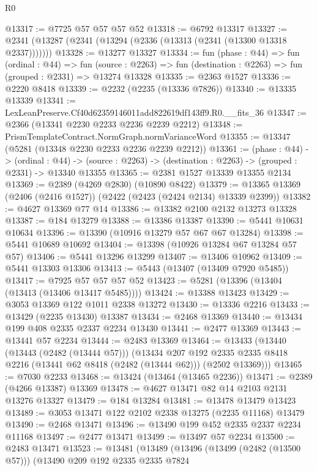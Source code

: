 \begin{lexlean}{R0}
\begin{coremodule}
@13317 := @7725 @57 @57 @57 @52
@13318 := @6792 @13317
@13327 := @2341 (@13287 (@2341 (@13294 (@2336 (@13313 (@2341 (@13300 @13318 @2337)))))))
@13328 := @13277 @13327
@13334 := fun (phase : @44) =>
  fun (ordinal : @44) =>
  fun (source : @2263) => fun (destination : @2263) => fun (grouped : @2331) => @13274 @13328
@13335 := @2363 @1527
@13336 := @2220 @8418
@13339 := @2232 (@2235 (@13336 @7826))
@13340 := @13335 @13339
@13341 := LexLeanPreserve.Cf40d62359146011add822619df143ff9.R0.__fits_36
@13347 := @2366 (@13341 @2230 @2233 @2236 @2239 @2212)
@13348 := PrismTemplateContract.NormGraph.normVarianceWord
@13355 := @13347 (@5281 (@13348 @2230 @2233 @2236 @2239 @2212))
@13361 := (phase : @44) ->
  (ordinal : @44) -> (source : @2263) -> (destination : @2263) -> (grouped : @2331) -> @13340 @13355
@13365 := @2381 @1527 @13339 @13355 @2134
@13369 := @2389 (@4269 @2830) (@10890 @8422)
@13379 := @13365 @13369 (@2406 (@2416 @1527)) (@2422 (@2423 (@2424 @2134) @13339 @2399))
@13382 := @4627 @13369 @77 @14
@13386 := @13382 @2100 @2132 @13273 @13328
@13387 := @184 @13279
@13388 := @13386 @13387
@13390 := @5441 @10631 @10634
@13396 := @13390 (@10916 @13279 @57 @67 @67 @13284)
@13398 := @5441 @10689 @10692
@13404 := @13398 (@10926 @13284 @67 @13284 @57 @57)
@13406 := @5441 @13296 @13299
@13407 := @13406 @10962
@13409 := @5441 @13303 @13306
@13413 := @5443 (@13407 (@13409 @7920 @5485))
@13417 := @7925 @57 @57 @57 @52
@13423 := @5281 (@13396 (@13404 (@13413 (@13406 @13417 @5485))))
@13424 := @13388 @13423
@13429 := @3053 @13369 @122 @1011 @2338 @13272
@13430 := @13336 @2216
@13433 := @13429 (@2235 @13430) @13387
@13434 := @2468 @13369
@13440 := @13434 @199 @408 @2335 @2337 @2234 @13430
@13441 := @2477 @13369
@13443 := @13441 @57 @2234
@13444 := @2483 @13369
@13464 := @13433
    (@13440
      (@13443 (@2482 (@13444 @57)))
      (@13434
        @207
        @192
        @2335
        @2335
        @8418
        @2216
        (@13441 @62 @8418 (@2482 (@13444 @62)))
        (@2502 @13369)))
@13465 := @7030 @2233
@13468 := @13424 (@13464 (@13465 @2236))
@13471 := @2389 (@4266 @13387) @13369
@13478 := @4627 @13471 @82 @14 @2103 @2131 @13276 @13327
@13479 := @184 @13284
@13481 := @13478 @13479 @13423
@13489 := @3053 @13471 @122 @2102 @2338 @13275 (@2235 @11168) @13479
@13490 := @2468 @13471
@13496 := @13490 @199 @452 @2335 @2337 @2234 @11168
@13497 := @2477 @13471
@13499 := @13497 @57 @2234
@13500 := @2483 @13471
@13523 := @13481
    (@13489
      (@13496
        (@13499 (@2482 (@13500 @57)))
        (@13490
          @209
          @192
          @2335
          @2335
          @7824

\end{coremodule}
\end{lexlean}
